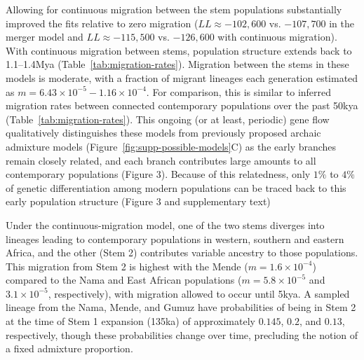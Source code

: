 \documentclass[]{article}
\begin{document}
Allowing for continuous migration between the stem populations substantially
improved the fits relative to zero migration ($LL \approx -102,600$ vs.
$-107,700$ in the merger model and $LL \approx -115,500$ vs. $-126,600$ with
continuous migration). With continuous migration between stems, population
structure extends back to 1.1--1.4Mya (Table~\ref{tab:migration-rates}).
Migration between the stems in these models is moderate, with a fraction of
migrant lineages each generation estimated as
$m=6.43\times10^{-5}-1.16\times10^{-4}$. For comparison, this is similar
to inferred migration rates between connected contemporary populations over the
past 50kya (Table~\ref{tab:migration-rates}). This ongoing (or at least,
periodic) gene flow qualitatively distinguishes these models from previously
proposed archaic admixture models (Figure~\ref{fig:supp-possible-models}C) as
the early branches remain closely related, and each branch contributes large amounts to all contemporary populations (Figure 3). 
Because of this 
relatedness, only $1\%$ to $4\%$ of genetic differentiation among modern populations can be traced back
to this early population structure (Figure 3 and supplementary text)
 
Under the continuous-migration model, one of the two stems diverges into
lineages leading to contemporary populations in western, southern and eastern
Africa, and the other (Stem 2) contributes variable ancestry to those
populations. This migration from Stem 2 is highest with the Mende
($m=1.6\times10^{-4}$) compared to the Nama and East African populations
($m=5.8\times10^{-5}$ and $3.1\times10^{-5}$, respectively), with migration
allowed to occur until 5kya. A
sampled lineage from the Nama, Mende, and Gumuz have probabilities of being in
Stem 2 at the time of Stem 1 expansion (135ka) of approximately $0.145$, $0.2$,
and $0.13$, respectively, though these probabilities change over time,
precluding the notion of a fixed admixture proportion.
\end{document}
